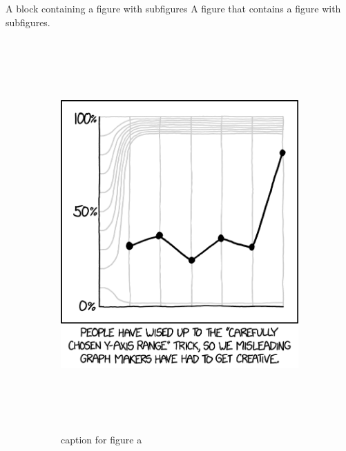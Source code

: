 \documentclass[final]{beamer}
\newlength{\colwidth}
\begin{document}
\begin{frame}[t]
\begin{columns}[t]
\begin{column}{\colwidth}
\begin{block}{A block containing a figure with subfigures}
    A figure that contains a figure with subfigures.

    \begin{figure}
      \centering
      \begin{subfigure}{0.49\textwidth}
        \centering
        \includegraphics[height=15cm]{./images/y_axis_2x.png}
        \caption{caption for figure a}    %
      \end{subfigure}
      \hfill
      \begin{subfigure}{0.49\textwidth}
        \centering

\end{subfigure}
\end{figure}
\end{block}
\end{column}
\end{columns}
\end{frame}
\end{document}
